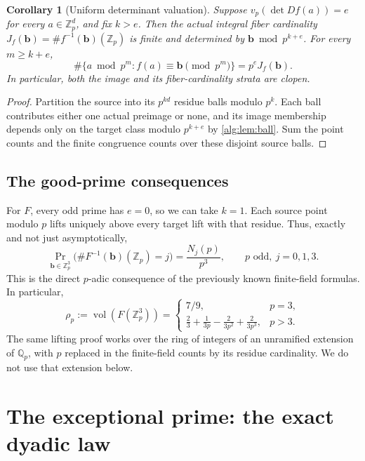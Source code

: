 \documentclass[11pt]{article}
\numberwithin{equation}{section}
\theoremstyle{plain}
\theoremstyle{plain}
\theoremstyle{plain}
\newtheorem{corollary}[corollary]{Corollary}
\theoremstyle{definition}
\theoremstyle{definition}
\theoremstyle{definition}
\theoremstyle{remark}
\newcommand{\Z}{\mathbb Z}\newcommand{\Q}{\mathbb Q}
\newcommand{\vol}{\operatorname{vol}}
\newcommand{\target}{\boldsymbol b}
\begin{document}
\begin{corollary}[Uniform determinant valuation]\label{alg:cor:precision}
Suppose $v_p(\det Df(a))=e$ for every $a\in\Z_p^d$, and fix $k>e$.
Then the actual integral fiber cardinality
$J_f(\target)=\#f^{-1}(\target)(\Z_p)$ is finite and determined by
$\target\bmod p^{k+e}$. For every $m\ge k+e$,
\begin{equation}\label{alg:eq:finiteactual}
 \#\{a\bmod p^m:f(a)\equiv\target\pmod{p^m}\}
 =p^eJ_f(\target).
\end{equation}
In particular, both the image and its fiber-cardinality strata are clopen.
\end{corollary}
\begin{proof}
Partition the source into its $p^{kd}$ residue balls modulo $p^k$.
Each ball contributes either one actual preimage or none, and its image
membership depends only on the target class modulo $p^{k+e}$ by
\cref{alg:lem:ball}. Sum the point counts and the finite congruence counts
over these disjoint source balls.
\end{proof}

\subsection{The good-prime consequences}
For $F$, every odd prime has $e=0$, so we can take $k=1$.
Each source point modulo $p$ lifts uniquely above every target lift
with that residue. Thus, exactly and not just asymptotically,
\begin{equation}\label{alg:eq:oddpadiclaw}
 \Pr_{\target\in\Z_p^3}
 \bigl(\#F^{-1}(\target)(\Z_p)=j\bigr)=\frac{N_j(p)}{p^3},
 \qquad p\text{ odd},\ j=0,1,3.
\end{equation}
This is the direct $p$-adic consequence of the previously known
finite-field formulas. In particular,
\begin{equation}\label{alg:eq:oddimage}
 \rho_p:=\vol(F(\Z_p^3))=
 \begin{cases}
 7/9,&p=3,\\[2pt]
 \displaystyle\frac23+\frac1{3p}-\frac2{3p^2}+\frac2{3p^3},&p>3.
 \end{cases}
\end{equation}
The same lifting proof works over the ring of integers of an unramified
extension of $\Q_p$, with $p$ replaced in the finite-field counts by its
residue cardinality. We do not use that extension below.

\section{The exceptional prime: the exact dyadic law}\label{alg:sec:dyadic}
\end{document}
